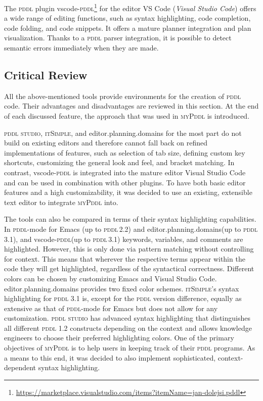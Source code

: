 \documentclass[runningheads]{llncs}
\newcommand{\mypddl}{\textsc{myPddl}\xspace}
\newcommand{\pddlstudio}{\textsc{pddl studio}\xspace}
\newcommand{\epd}{editor.planning.domains\xspace}
\newcommand{\itsimple}{\textsc{itSimple}\xspace}
\newcommand{\pddlmode}{\textsc{pddl}-mode\xspace}
\newcommand{\vscode}{vscode-\textsc{pddl}\xspace}
\newcommand{\pddl}{\textsc{pddl}\xspace}
\begin{document}
The \pddl plugin
\vscode\footnote{\url{https://marketplace.visualstudio.com/items?itemName=jan-dolejsi.pddl}}
for the editor VS Code (\emph{Visual Studio Code}) offers a wide range
of editing functions, such as syntax highlighting, code completion,
code folding, and code snippets. It offers a mature planner
integration and plan visualization. Thanks to a \pddl parser
integration, it is possible to detect semantic errors immediately when
they are made.

\subsection{Critical Review}
\label{sec-3-4}

All the above-mentioned tools provide environments for the creation of
\pddl code. Their advantages and disadvantages are reviewed in this
section. At the end of each discussed feature, the approach that was
used in \mypddl is introduced.

\pddlstudio, \itsimple, and \epd for the most part do not build on
existing editors and therefore cannot fall back on refined
implementations of features, such as selection of tab size, defining
custom key shortcuts, customizing the general look and feel, and
bracket matching. In contrast, \vscode is integrated into the
mature editor Visual Studio Code and can be used in combination with
other plugins. To have both basic editor features and a high
customizability, it was decided to use an existing, extensible text
editor to integrate \mypddl into.

The tools can also be compared in terms of their syntax highlighting
capabilities. In \pddlmode for Emacs (up to \pddl\,2.2) and \epd (up
to \pddl\,3.1), and \vscode (up to \pddl\,3.1) keywords, variables,
and comments are highlighted. However, this is only done via pattern
matching without controlling for context. This means that wherever the
respective terms appear within the code they will get highlighted,
regardless of the syntactical correctness. Different colors can be
chosen by customizing Emacs and Visual Studio Code. \epd provides two
fixed color schemes. \itsimple's syntax highlighting for \pddl 3.1 is,
except for the \pddl version difference, equally as extensive as that
of \pddlmode for Emacs but does not allow for any customization.
\pddlstudio has advanced syntax highlighting that distinguishes all
different \pddl 1.2 constructs depending on the context and allows
knowledge engineers to choose their preferred highlighting colors. One
of the primary objectives of \mypddl is to help users in keeping track
of their \pddl programs. As a means to this end, it was decided to
also implement sophisticated, context-dependent syntax highlighting.
\end{document}

